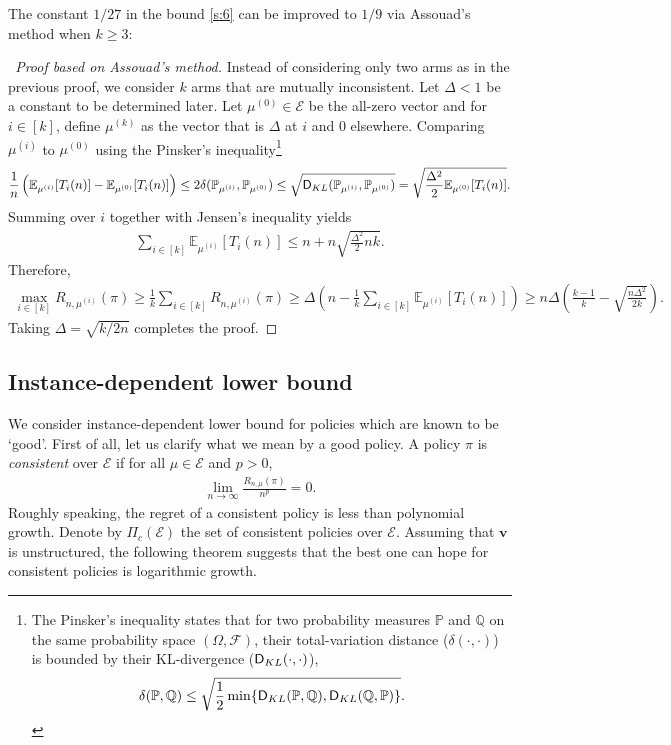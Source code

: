 \documentclass[10pt, openright]{book}
\numberwithin{equation}{section}
\theoremstyle{plain}
\theoremstyle{definition}
\def\Q{{\mathbb Q}}
\def\E{{\mathbb E}}
\def\P{{\mathbb P}}
\def\V{{\mathcal E}}
\def\v{{\mathbf{v}}}
\begin{document}
The constant $1/27$ in the bound \eqref{s:6} can be improved to $1/9$ via Assouad's method when $k\geq 3$: 

\begin{proof}[~Proof based on Assouad's method]
Instead of considering only two arms as in the previous proof, we consider $k$ arms that are mutually inconsistent. Let $\Delta<1$ be a constant to be determined later. Let $\mu^{(0)}\in\mathcal E$ be the all-zero vector and for $i\in [k]$, define $\mu^{(k)}$ as the vector that is $\Delta$ at $i$ and $0$ elsewhere. Comparing $\mu^{(i)}$ to $\mu^{(0)}$ using the Pinsker's inequality\footnote{The Pinsker's inequality states that for two probability measures $\P$ and $\Q$ on the same probability space $(\Omega, \mathcal{F})$, their total-variation distance ($\delta(\cdot, \cdot)$) is bounded by their KL-divergence ($\textsf D_{KL}(\cdot, \cdot)$), 
\begin{align}
\delta (\P, \Q)\leq\sqrt{\frac{1}{2}\min\{\textsf D_{KL}(\P, \Q), \textsf D_{KL}(\Q, \P)\}}. \label{s:pinsker}
\end{align}} 
\begin{align*}
\frac{1}{n}\left(\E_{\mu^{(i)}}[T_i(n)]-\E_{\mu^{(0)}}[T_i(n)]\right)\leq 2\delta(\P_{\mu^{(i)}}, \P_{\mu^{(0)}})\leq\sqrt{\textsf D_{KL}(\P_{\mu^{(i)}}, \P_{\mu^{(0)}})}=\sqrt{\frac{\Delta^2}{2}\E_{\mu^{(0)}}[T_i(n)]}. 
\end{align*}
Summing over $i$ together with Jensen's inequality yields
\begin{align*}
\sum_{i\in [k]}\E_{\mu^{(i)}}[T_i(n)]\leq n+n\sqrt{\frac{\Delta^2}{2}nk}. 
\end{align*}
Therefore,
\begin{align*}
\max_{i\in [k]}R_{n, \mu^{(i)}}(\pi)\geq\frac{1}{k}\sum_{i\in [k]}R_{n, \mu^{(i)}}(\pi)\geq \Delta\left(n-\frac{1}{k}\sum_{i\in [k]}\E_{\mu^{(i)}}[T_i(n)]\right)\geq n\Delta\left(\frac{k-1}{k}-\sqrt{\frac{n\Delta^2}{2k}}\right). 
\end{align*}
Taking $\Delta=\sqrt{k/2n}$ completes the proof. 
\end{proof}


\subsection{Instance-dependent lower bound}

We consider instance-dependent lower bound for policies which are known to be `good'. First of all, let us clarify what we mean by a good policy. A policy $\pi$ is \emph{consistent} over $\V$ if for all $\mu\in\V$ and $p>0$, 
\begin{align*}
\lim_{n\rightarrow\infty}\frac{R_{n, \mu}(\pi)}{n^p} = 0. 
\end{align*}
Roughly speaking, the regret of a consistent policy is less than polynomial growth. Denote by $\Pi_{c}(\V)$ the set of consistent policies over $\V$. Assuming that $\v$ is unstructured, the following theorem suggests that the best one can hope for consistent policies is logarithmic growth. 
\end{document}
